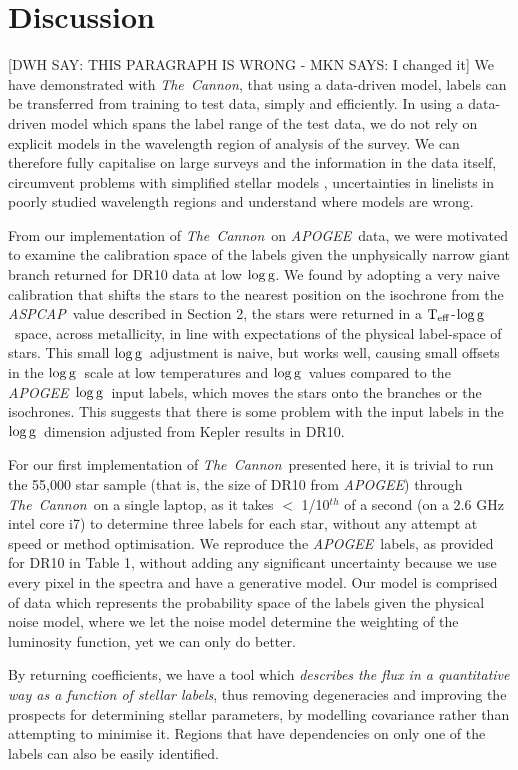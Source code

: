 \documentclass[12pt, preprint]{aastex}
\newcommand{\teff}{\mbox{$\rm T_{eff}$}}
\newcommand{\logg}{\mbox{$\rm \log g$}}
\newcommand{\tc}{\textsl{The~Cannon}}
\newcommand{\apogee}{\textsl{APOGEE}}
\newcommand{\aspcap}{\textsl{ASPCAP}}
\begin{document}
\section{Discussion}

[DWH SAY: THIS PARAGRAPH IS WRONG - MKN SAYS: I changed it] We have demonstrated with \tc,  that using a data-driven model, labels can be transferred from training to test data, simply and efficiently. 
In using a data-driven model which spans the label range of the test data, we do not rely on explicit models in the wavelength region of analysis of the survey. 
We can therefore fully capitalise on large surveys and the information in the data itself, circumvent problems with simplified stellar models , uncertainties in linelists in poorly studied wavelength regions and understand where models are wrong.  

From our implementation of \tc\ on \apogee\ data, we were motivated to examine the calibration space of the labels given the unphysically narrow giant branch returned for DR10 data at low \logg. 
We found by adopting a very naive calibration that shifts the stars to the nearest position on the isochrone from the \aspcap\ value described in Section 2, the stars were returned in a \teff-\logg\ space, across metallicity, in line with expectations of the physical label-space of stars. 
This small \logg\ adjustment is naive, but works well, causing small offsets in the \logg\ scale at low temperatures and \logg\ values compared to the \apogee\ \logg\ input labels, which moves the stars onto the branches or the isochrones. 
This suggests that there is some problem with the input labels in the \logg\ dimension adjusted from Kepler results in DR10. 

For our first implementation of \tc\ presented here, it is trivial to run the 55,000 star sample (that is, the size of DR10 from \apogee) through \tc\ on a single laptop, as it takes $<$ 1/10$^{th}$ of a second (on a 2.6 GHz intel core i7) to determine three labels for each star, without any attempt at speed or method optimisation. 
We reproduce the \apogee\ labels, as provided for DR10 in Table 1, without adding any significant uncertainty because we use every pixel in the spectra and have a generative model. 
Our model is comprised of data which represents the probability space of the labels given the physical noise model,  where we let the noise model determine the weighting of the luminosity function, yet we can only do better. 

By returning coefficients, we have a tool which \textit{describes the flux in a quantitative way as a function of stellar labels}, thus removing degeneracies and improving the prospects for determining stellar parameters, by modelling covariance rather than attempting to minimise it. Regions that have dependencies on only one of the labels can also be easily identified. 
\end{document}
